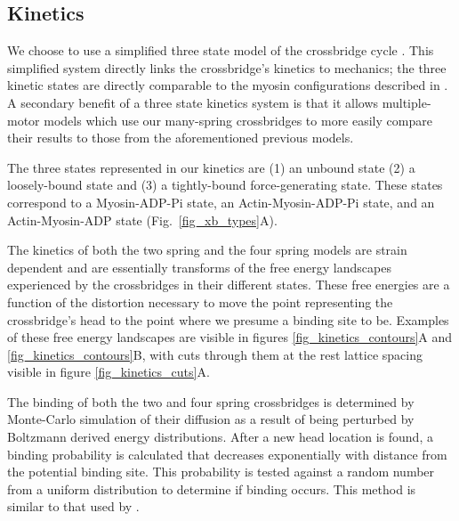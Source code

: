 \documentclass[]{article}
\begin{document}
\subsection*{Kinetics} %
We choose to use a simplified three state model of the crossbridge cycle \citep{Pate1989, Tanner2007}. 
This simplified system directly links the crossbridge's kinetics to mechanics; the three kinetic states are directly comparable to the myosin configurations described in \citet{Houdusse:2000:p11238}.
A secondary benefit of a three state kinetics system is that it allows multiple-motor models which use our many-spring crossbridges to more easily compare their results to those from the aforementioned previous models.

The three states represented in our kinetics are (1) an unbound state (2) a loosely-bound state and (3) a tightly-bound force-generating state.
These states correspond to a Myosin-ADP-Pi state, an Actin-Myosin-ADP-Pi state, and an Actin-Myosin-ADP state (Fig.~\ref{fig_xb_types}A).

The kinetics of both the two spring and the four spring models are strain dependent and are essentially transforms of the free energy landscapes experienced by the crossbridges in their different states.
These free energies are a function of the distortion necessary to move the point representing the crossbridge's head to the point where we presume a binding site to be.
Examples of these free energy landscapes are visible in figures \ref{fig_kinetics_contours}A and \ref{fig_kinetics_contours}B, with cuts through them at the rest lattice spacing visible in figure \ref{fig_kinetics_cuts}A.

The binding of both the two and four spring crossbridges is determined by Monte-Carlo simulation of their diffusion as a result of being perturbed by Boltzmann derived energy distributions. 
After a new head location is found, a binding probability is calculated that decreases exponentially with distance from the potential binding site. 
This probability is tested against a random number from a uniform distribution to determine if binding occurs.
This method is similar to that used by \citet{Tanner2007}. 
\end{document}
